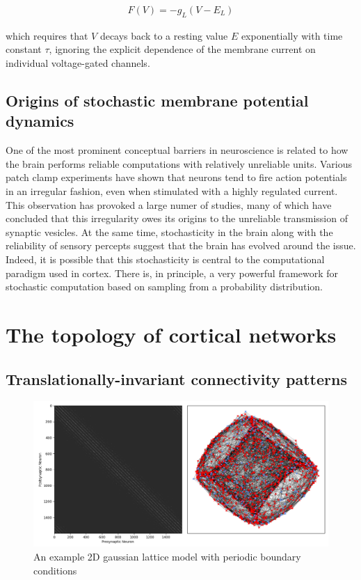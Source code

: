 \documentclass{ucetd}
\begin{document}
\begin{align*}
F(V) = -g_{L}(V-E_{L})
\end{align*}


which requires that $V$ decays back to a resting value $E$ exponentially with time constant $\tau$, ignoring the explicit dependence of the membrane current on individual voltage-gated channels.

\section{Origins of stochastic membrane potential dynamics}

One of the most prominent conceptual barriers in neuroscience is related to how the brain performs reliable computations with relatively unreliable units. Various patch clamp experiments have shown that neurons tend to fire action potentials in an irregular fashion, even when stimulated with a highly regulated current. This observation has provoked a large numer of studies, many of which have concluded that this irregularity owes its origins to the unreliable transmission of synaptic vesicles. At the same time, stochasticity in the brain along with the reliability of sensory percepts suggest that the brain has evolved around the issue. Indeed, it is possible that this stochasticity is central to the computational paradigm used in cortex. There is, in principle, a very powerful framework for stochastic computation based on sampling from a probability distribution.

\chapter{The topology of cortical networks}

\section{Translationally-invariant connectivity patterns}

\begin{figure}
\centering
\includegraphics[width=150mm]{fig_5-A}
\caption{An example 2D gaussian lattice model with periodic boundary conditions}
\end{figure}
\end{document}
